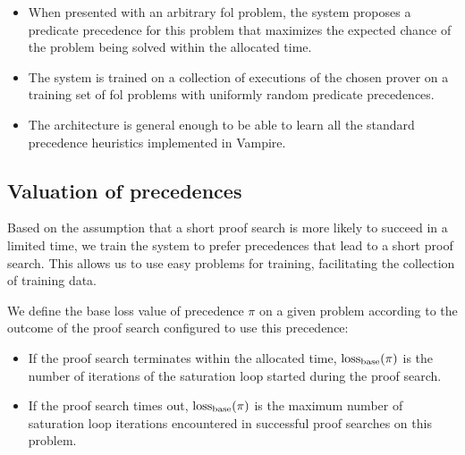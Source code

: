 \begin{itemize}
	\item When presented with an arbitrary \gls{fol} problem,
	the system proposes a predicate precedence for this problem
	that maximizes the expected chance of the problem being solved
	within the allocated time.
	
	
	\item The system is trained on a collection of executions of the chosen prover
	on a training set of \gls{fol} problems
	with uniformly random predicate precedences.
	
	\item The architecture is general enough to be able to learn
	all the standard precedence heuristics implemented in Vampire.\cite{?}
\end{itemize}


\subsection{Valuation of precedences}
\label{sec:precedence-valuation}

Based on the assumption that a short proof search is more likely to succeed in a limited time\cite{?},
we train the system to prefer precedences that lead to a short proof search.
This allows us to use easy problems for training, facilitating the collection of training data.

We define the base loss
value of precedence \(\pi\) on a given problem
according to the outcome of the proof search configured to use this precedence:

\begin{itemize}
	\item If the proof search terminates within the allocated time,
	\(\base_loss(\pi)\) is the number of iterations of the saturation loop
	started during the proof search.
	\item If the proof search times out, \(\base_loss(\pi)\) is the maximum number
	of saturation loop iterations encountered in successful proof searches on this problem.
\end{itemize}


